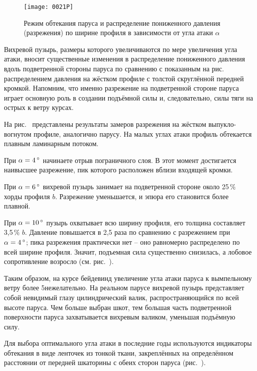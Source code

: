 \begin{figure*}[!htb]
  \centering
  \texttt{[image: 0021P]}
  \caption{Режим обтекания паруса и распределение пониженного давления
    (разрежения) по ширине профиля в зависимости от угла атаки
    $\alpha$}
  \label{fig:21}
\end{figure*}

Вихревой пузырь, размеры которого увеличиваются по мере увеличения угла атаки, вносит существенные изменения в распределение пониженного давления вдоль подветренной стороны паруса по сравнению с показанным на рис.~ распределением давления на жёстком профиле с толстой скруглённой передней кромкой. Напомним, что именно разрежение на подветренной стороне паруса играет основную роль в создании подъёмной силы и, следовательно, силы тяги на острых к ветру курсах. 

На рис.~ представлены результаты замеров разрежения на жёстком выпукло-вогнутом профиле, аналогично парусу. На малых углах атаки профиль обтекается плавным ламинарным потоком. 

При $\alpha = 4\,^\circ$ начинаете отрыв пограничного слоя. В этот момент достигается наивысшее разрежение, пик которого расположен вблизи входящей кромки.
 
При $\alpha = 6\,^\circ$ вихревой пузырь занимает на подветренной стороне около 25\,\% хорды профиля $b$. Разрежение уменьшается, и эпюра его становится более плавной. 

При $\alpha = 10\,^\circ$ пузырь охватывает всю ширину профиля, его толщина составляет 3,5\,\% $b$. Давление повышается в 2,5 раза по сравнению с разрежением при $\alpha = 4\,^\circ$; пика разрежения практически нет \--- оно равномерно распределено по всей ширине профиля. Значит, подъемная сила существенно снизилась, а лобовое сопротивление возросло (см. рис.~). 

Таким образом, на курсе бейдевинд увеличение угла атаки паруса к вымпельному ветру более 5\gr нежелательно. На реальном парусе вихревой пузырь представляет собой невидимый глазу цилиндрический валик, распространяющийся по всей высоте паруса. Чем больше выбран шкот, тем большая часть подветренной поверхности паруса захватывается вихревым валиком, уменьшая подъёмную силу. 

Для выбора оптимального угла атаки в последние годы используются индикаторы обтекания в виде ленточек из тонкой ткани, закреплённых на определённом расстоянии от передней шкаторины с обеих сторон паруса (рис.~).

